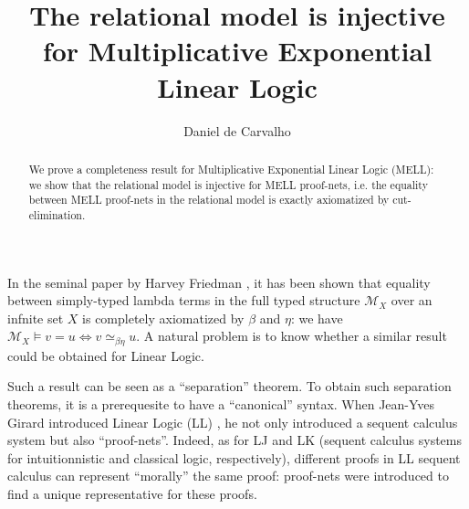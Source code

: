 \documentclass{article}
\title{The relational model is injective for Multiplicative Exponential Linear Logic}
\author{Daniel de Carvalho}
\theoremstyle{plain}
\begin{document}
\maketitle

\begin{abstract}
We prove a completeness result for Multiplicative Exponential Linear Logic (MELL): we show that the relational model is injective for MELL proof-nets, i.e. the equality between MELL proof-nets in the relational model is exactly axiomatized by cut-elimination.
\end{abstract}



In the seminal paper by Harvey Friedman \cite{Friedman}, it has been shown that equality between simply-typed lambda terms in the full typed structure $\mathcal{M}_X$ over an infnite set $X$ is completely axiomatized by $\beta$ and $\eta$: we have $\mathcal{M}_X \vDash v = u \Leftrightarrow v \simeq_{\beta \eta} u$. A natural problem is to know whether a similar result could be obtained for Linear Logic. 

Such a result can be seen as a ``separation'' theorem. To obtain such separation theorems, it is a prerequesite to have a ``canonical'' syntax. 
When Jean-Yves Girard introduced Linear Logic (LL) \cite{ll}, he not only introduced a sequent calculus system but also ``proof-nets''. Indeed, as for LJ and LK (sequent calculus systems for intuitionnistic and classical logic, respectively), different proofs in LL sequent calculus can represent ``morally'' the same proof: proof-nets were introduced to find a unique representative for these proofs. 
\end{document}
